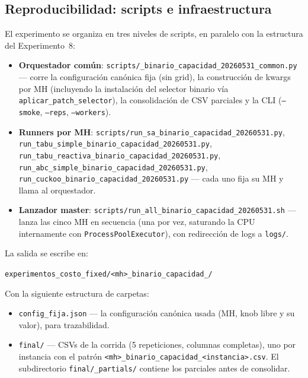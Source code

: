 \subsection{Reproducibilidad: scripts e infraestructura}

El experimento se organiza en tres niveles de scripts, en paralelo con
la estructura del Experimento~8:

\begin{itemize}
\item \textbf{Orquestador común}:
  \texttt{scripts/\_binario\_capacidad\_20260531\_common.py} ---
  corre la configuración canónica fija (sin grid), la construcción de
  kwargs por MH (incluyendo la instalación del selector binario vía
  \texttt{aplicar\_patch\_selector}), la consolidación de CSV parciales
  y la CLI (\texttt{--smoke}, \texttt{--reps}, \texttt{--workers}).
\item \textbf{Runners por MH}:
  \texttt{scripts/run\_sa\_binario\_capacidad\_20260531.py},
  \texttt{run\_tabu\_simple\_binario\_capacidad\_20260531.py},
  \texttt{run\_tabu\_reactiva\_binario\_capacidad\_20260531.py},
  \texttt{run\_abc\_simple\_binario\_capacidad\_20260531.py},
  \texttt{run\_cuckoo\_binario\_capacidad\_20260531.py} ---
  cada uno fija su MH y llama al orquestador.
\item \textbf{Lanzador master}:
  \texttt{scripts/run\_all\_binario\_capacidad\_20260531.sh} ---
  lanza las cinco MH en secuencia (una por vez, saturando la CPU
  internamente con \texttt{ProcessPoolExecutor}), con redirección de
  logs a \texttt{logs/}.
\end{itemize}

La salida se escribe en:
\begin{center}
\texttt{experimentos\_costo\_fixed/<mh>\_binario\_capacidad\_<YYYYMMDD-HHMM>/}
\end{center}

Con la siguiente estructura de carpetas:

\begin{itemize}
\item \texttt{config\_fija.json} --- la configuración canónica usada
  (MH, knob libre y su valor), para trazabilidad.
\item \texttt{final/} --- CSVs de la corrida (5 repeticiones, columnas
  completas), uno por instancia con el patrón
  \texttt{<mh>\_binario\_capacidad\_<instancia>.csv}.
  El subdirectorio \texttt{final/\_partials/} contiene los parciales
  antes de consolidar.
\end{itemize}

